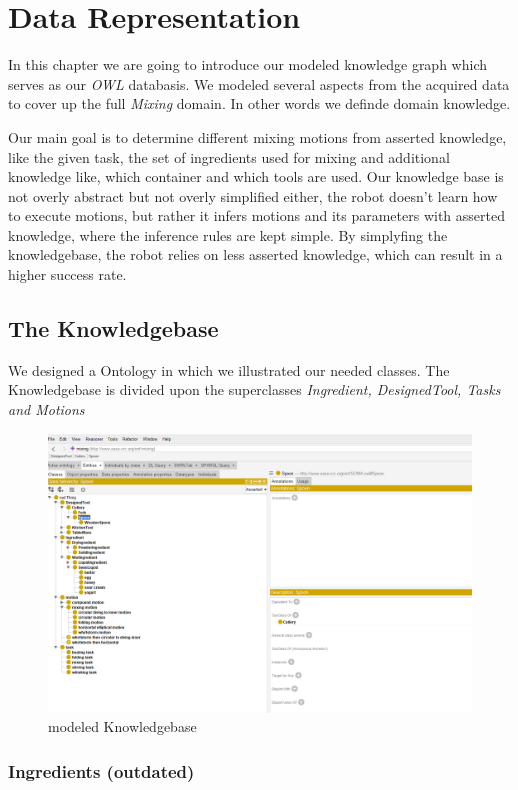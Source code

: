 \chapter{Data Representation}
\label{chap:Data_representation}

In this chapter we are going to introduce our modeled knowledge graph which serves as our \textit{OWL} databasis. We modeled several aspects from the acquired data to cover up the full \textit{Mixing} domain. In other words we definde domain knowledge.

Our main goal is to determine different mixing motions from asserted knowledge, like the given task, the set of ingredients used for mixing and additional knowledge like, which container and which tools are used.
Our knowledge base is not overly abstract but not overly simplified either, the robot doesn't learn how to execute motions, but rather it infers motions and its parameters with asserted knowledge, where the inference rules are kept simple.
By simplyfing the knowledgebase, the robot relies on less asserted knowledge, which can result in a higher success rate.

\section{The Knowledgebase}
We designed a Ontology in which we illustrated our needed classes. 
The Knowledgebase is divided upon the superclasses \textit{Ingredient, DesignedTool, Tasks and Motions }
\begin{figure}[H]
\includegraphics[scale=0.32]{Graphics/ontology05.png}
\caption{modeled Knowledgebase}
\end{figure}

\subsection{Ingredients (outdated)}

